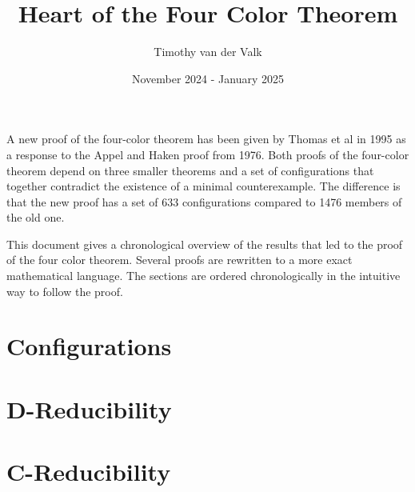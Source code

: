 \documentclass{article}
\title{Heart of the Four Color Theorem}
\author{Timothy van der Valk}
\date{November 2024 - January 2025}
\begin{document}
\maketitle

A new proof of the four-color theorem has been given by Thomas et al \cite{thomas} in 1995 as a response to the Appel and Haken proof from 1976. Both proofs of the four-color theorem depend on three smaller theorems and a set of configurations that together contradict the existence of a minimal counterexample. The difference is that the new proof has a set of 633 configurations compared to 1476 members of the old one.

This document gives a chronological overview of the results that led to the proof of the four color theorem. Several proofs are rewritten to a more exact mathematical language. The sections are ordered chronologically in the intuitive way to follow the proof.


\tableofcontents

\pagebreak




\section{Configurations}
\label{sec:config}

\section{D-Reducibility}
\section{C-Reducibility}
\label{sec:reduce}

\pagebreak
\printbibliography
\end{document}
